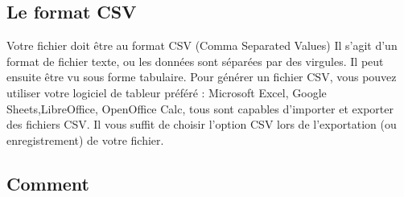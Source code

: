 \documentclass{article}
\begin{document}
\subsection{Le format CSV}
Votre fichier doit être au format CSV (Comma Separated Values)
Il s'agit d'un format de fichier texte, ou les données sont séparées par des virgules.
Il peut ensuite être vu sous forme tabulaire.
Pour générer un fichier CSV, vous pouvez utiliser votre logiciel de tableur préféré :
Microsoft Excel, Google Sheets,LibreOffice, OpenOffice Calc, tous sont capables d'importer
et exporter des fichiers CSV.
Il vous suffit de choisir l'option CSV lors de l'exportation (ou enregistrement) de votre fichier.

\subsection{Comment }
\end{document}
